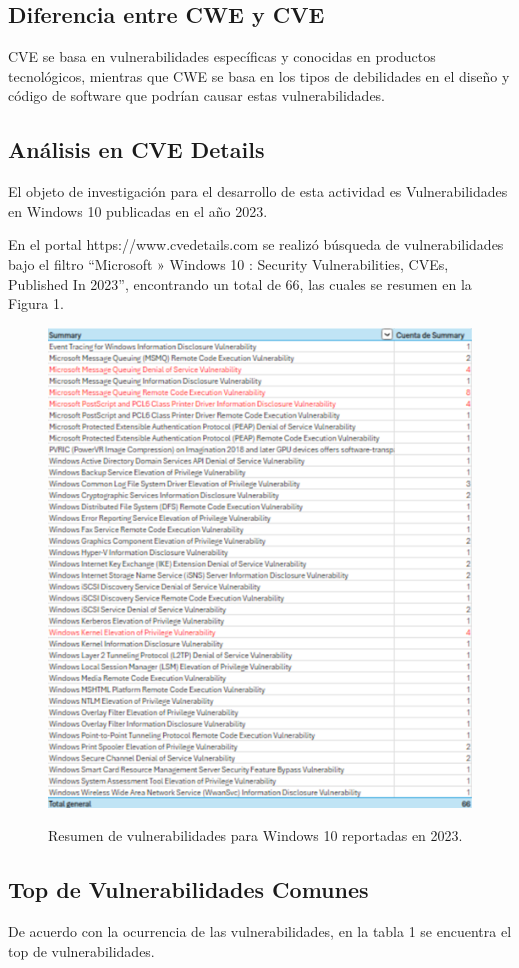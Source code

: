 \documentclass[stu, 11pt, letterpaper, donotrepeattitle, floatsintext, natbib]{apa7}
\begin{document}
\subsection{Diferencia entre CWE y CVE} 

CVE se basa en vulnerabilidades específicas y conocidas en productos tecnológicos, mientras que CWE se basa en los tipos de debilidades en el diseño y código de software que podrían causar estas vulnerabilidades.

\subsection{Análisis en CVE Details} 

El objeto de investigación para el desarrollo de esta actividad es Vulnerabilidades en Windows 10 publicadas en el año 2023.

En el portal https://www.cvedetails.com se realizó búsqueda de vulnerabilidades bajo el filtro “Microsoft » Windows 10 : Security Vulnerabilities, CVEs, Published In 2023”, encontrando un total de 66, las cuales se resumen en la Figura 1.

\begin{figure}[H]
    \centering
    \caption{Resumen de vulnerabilidades para Windows 10 reportadas en 2023.}
    \includegraphics[width=0.3\linewidth]{ac11.png} %
    \label{fig:OverallEffect}
\end{figure}

\subsection{Top de Vulnerabilidades Comunes} 

De acuerdo con la ocurrencia de las vulnerabilidades, en la tabla 1 se encuentra el top de vulnerabilidades.
\end{document}

